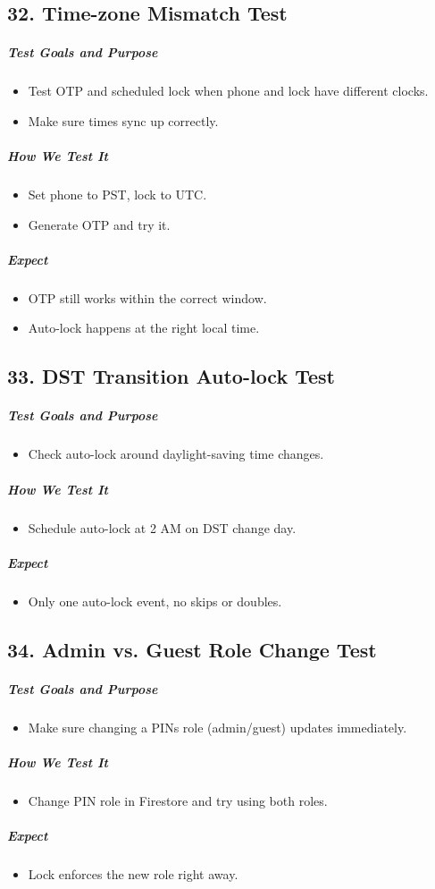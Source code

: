 \subsection*{32. Time-zone Mismatch Test}
\subparagraph{Test Goals and Purpose}
\begin{itemize}
    \item Test OTP and scheduled lock when phone and lock have different clocks.
    \item Make sure times sync up correctly.
\end{itemize}
\subparagraph{How We Test It}
\begin{itemize}
    \item Set phone to PST, lock to UTC.
    \item Generate OTP and try it.
\end{itemize}
\subparagraph{ Expect}
\begin{itemize}
    \item OTP still works within the correct window.
    \item Auto-lock happens at the right local time.
\end{itemize}

\subsection*{33. DST Transition Auto-lock Test}
\subparagraph{Test Goals and Purpose}
\begin{itemize}
    \item Check auto-lock around daylight-saving time changes.
\end{itemize}
\subparagraph{How We Test It}
\begin{itemize}
    \item Schedule auto-lock at 2 AM on DST change day.
\end{itemize}
\subparagraph{ Expect}
\begin{itemize}
    \item Only one auto-lock event, no skips or doubles.
\end{itemize}

\subsection*{34. Admin vs. Guest Role Change Test}
\subparagraph{Test Goals and Purpose}
\begin{itemize}
    \item Make sure changing a PINs role (admin/guest) updates immediately.
\end{itemize}
\subparagraph{How We Test It}
\begin{itemize}
    \item Change PIN role in Firestore and try using both roles.
\end{itemize}
\subparagraph{ Expect}
\begin{itemize}
    \item Lock enforces the new role right away.
\end{itemize}

